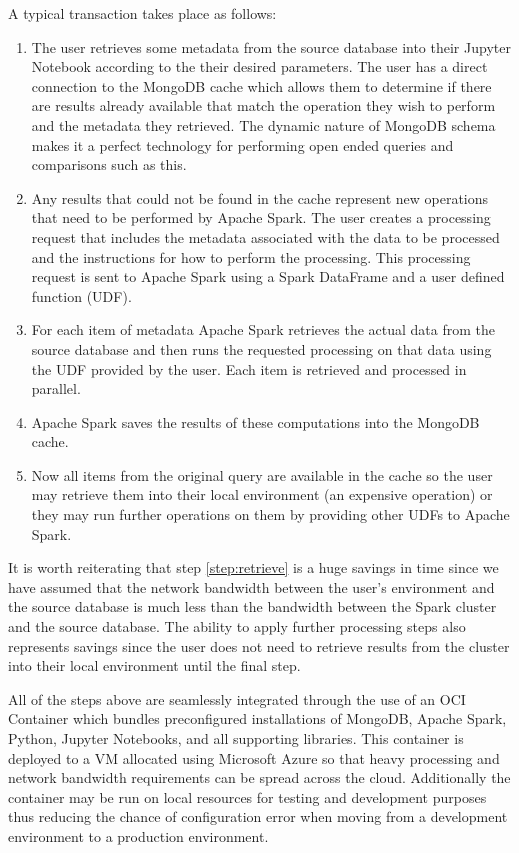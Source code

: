 \documentclass[conference,twoside]{IEEEtran}
\begin{document}
A typical transaction takes place as follows:
\begin{enumerate}
  \item{The user retrieves some metadata from the source database into their Jupyter Notebook according to the their desired parameters. The user has a direct connection to the MongoDB cache which allows them to determine if there are results already available that match the operation they wish to perform and the metadata they retrieved. The dynamic nature of MongoDB schema makes it a perfect technology for performing open ended queries and comparisons such as this.}
  \item{Any results that could not be found in the cache represent new operations that need to be performed by Apache Spark. The user creates a processing request that includes the metadata associated with the data to be processed and the instructions for how to perform the processing. This processing request is sent to Apache Spark using a Spark DataFrame and a user defined function (UDF).}
  \item{For each item of metadata Apache Spark retrieves the actual data from the source database and then runs the requested processing on that data using the UDF provided by the user. Each item is retrieved and processed in parallel.}\label{step:retrieve}
  \item{Apache Spark saves the results of these computations into the MongoDB cache.}
  \item{Now all items from the original query are available in the cache so the user may retrieve them into their local environment (an expensive operation) or they may run further operations on them by providing other UDFs to Apache Spark.}
\end{enumerate}

It is worth reiterating that step \ref{step:retrieve} is a huge savings in time since we have assumed that the network bandwidth between the user's environment and the source database is much less than the bandwidth between the Spark cluster and the source database. The ability to apply further processing steps also represents savings since the user does not need to retrieve results from the cluster into their local environment until the final step.

All of the steps above are seamlessly integrated through the use of an OCI Container which bundles preconfigured installations of MongoDB, Apache Spark, Python, Jupyter Notebooks, and all supporting libraries. This container is deployed to a VM allocated using Microsoft Azure so that heavy processing and network bandwidth requirements can be spread across the cloud. Additionally the container may be run on local resources for testing and development purposes thus reducing the chance of configuration error when moving from a development environment to a production environment.
\end{document}
